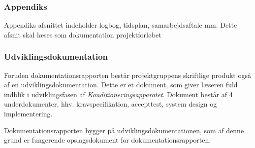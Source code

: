 \subsubsection{Appendiks}
Appendiks afsnittet indeholder logbog, tidsplan, samarbejdsaftale mm. Dette afsnit skal læses som dokumentation projektforløbet

\subsubsection{Udviklingsdokumentation}
Foruden dokumentationsrapporten består projektgruppens skriftlige produkt også af en udviklingsdokumentation. Dette er et dokument, som giver læseren fuld indblik i udviklingsfasen af \textit{Konditioneringsapparatet}. Dokument består af 4 underdokumenter, hhv. kravspecifikation, accepttest, system design og implementering. 

Dokumentationsrapporten bygger på udviklingsdokumentationen, som af denne grund er fungerende opslagsdokument for dokumentationsrapporten. 



